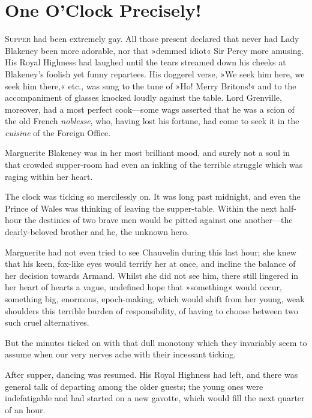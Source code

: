 
\chapter{One O'Clock Precisely!}
\lettrine[lines=4]{S}{upper} had been extremely gay. All those present declared that never had Lady Blakeney been more adorable, nor that »demmed idiot« Sir Percy more amusing. His Royal Highness had laughed until the tears streamed down his cheeks at Blakeney's foolish yet funny repartees. His doggerel verse, »We seek him here, we seek him there,« etc., was sung to the tune of »Ho! Merry Britons!« and to the accompaniment of glasses knocked loudly against the table. Lord Grenville, moreover, had a most perfect cook\allowbreak---\allowbreak some wags asserted that he was a scion of the old French \textit{noblesse}, who, having lost his fortune, had come to seek it in the \textit{cuisine} of the Foreign Office.

Marguerite Blakeney was in her most brilliant mood, and surely not a soul in that crowded supper-room had even an inkling of the terrible struggle which was raging within her heart.

The clock was ticking so mercilessly on. It was long past midnight, and even the Prince of Wales was thinking of leaving the supper-table. Within the next half-hour the destinies of two brave men would be pitted against one another\allowbreak---\allowbreak the dearly-beloved brother and he, the unknown hero.

Marguerite had not even tried to see Chauvelin during this last hour; she knew that his keen, fox-like eyes would terrify her at once, and incline the balance of her decision towards Armand. Whilst she did not see him, there still lingered in her heart of hearts a vague, undefined hope that »something« would occur, something big, enormous, epoch-making, which would shift from her young, weak shoulders this terrible burden of responsibility, of having to choose between two such cruel alternatives.

But the minutes ticked on with that dull monotony which they invariably seem to assume when our very nerves ache with their incessant ticking.

After supper, dancing was resumed. His Royal Highness had left, and there was general talk of departing among the older guests; the young ones were indefatigable and had started on a new gavotte, which would fill the next quarter of an hour.

